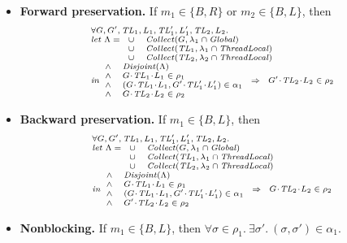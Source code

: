 \begin{itemize}
\item {\bf Forward preservation.}
If $m_1 \in \{B,R\}$ or $m_2 \in \{B,L\}$, then 
\[
\scriptsize{
\begin{array}{l}
\forall \varsG,\varsG',\varsTL_1,\varsL_1,\varsTL'_1,\varsL'_1,\varsTL_2,\varsL_2. \\
\mathit{let}\ \Lambda =
\begin{array}[t]{ll}
\cup & \Collect(\varsG, \lins_1 \cap \Global) \\
\cup & \Collect(\varsTL_1, \lins_1 \cap \ThreadLocal) \\
\cup & \Collect(\varsTL_2, \lins_2 \cap \ThreadLocal) 
\end{array} \\
\mathit{in}
\begin{array}{ll}
\wedge & \Disjoint(\Lambda) \\
\wedge & \MakeStore{\varsG}{\varsTL_1}{\varsL_1} \in \rho_1 \\
\wedge & (\MakeStore{\varsG}{\varsTL_1}{\varsL_1},\MakeStore{\varsG'}{\varsTL'_1}{\varsL'_1}) \in \alpha_1 \\
\wedge & \MakeStore{\varsG}{\varsTL_2}{\varsL_2} \in \rho_2 \\
\end{array} 
\Rightarrow 
\begin{array}{l}
\MakeStore{\varsG'}{\varsTL_2}{\varsL_2} \in \rho_2 
\end{array}
\end{array}
}
\]

\item {\bf Backward preservation.}
If $m_1 \in \{B,L\}$, then 
\[
\scriptsize{
\begin{array}{l}
\forall \varsG,\varsG',\varsTL_1,\varsL_1,\varsTL'_1,\varsL'_1,\varsTL_2,\varsL_2. \\
\mathit{let}\ \Lambda =
\begin{array}[t]{ll}
\cup & \Collect(\varsG, \lins_1 \cap \Global) \\
\cup & \Collect(\varsTL_1, \lins_1 \cap \ThreadLocal) \\
\cup & \Collect(\varsTL_2, \lins_2 \cap \ThreadLocal) 
\end{array} \\
\mathit{in}
\begin{array}{ll}
\wedge & \Disjoint(\Lambda) \\
\wedge & \MakeStore{\varsG}{\varsTL_1}{\varsL_1} \in \rho_1 \\
\wedge & (\MakeStore{\varsG}{\varsTL_1}{\varsL_1},\MakeStore{\varsG'}{\varsTL'_1}{\varsL'_1}) \in \alpha_1 \\
\wedge & \MakeStore{\varsG'}{\varsTL_2}{\varsL_2} \in \rho_2 \\
\end{array} 
\Rightarrow 
\begin{array}{l}
\MakeStore{\varsG}{\varsTL_2}{\varsL_2} \in \rho_2 
\end{array}
\end{array}
}
\]

\item {\bf Nonblocking.}
If $m_1 \in \{B, L\}$, then
$\forall \sigma \in \rho_1.\ \exists \sigma'.\ (\sigma, \sigma') \in \alpha_1$.
\end{itemize}

